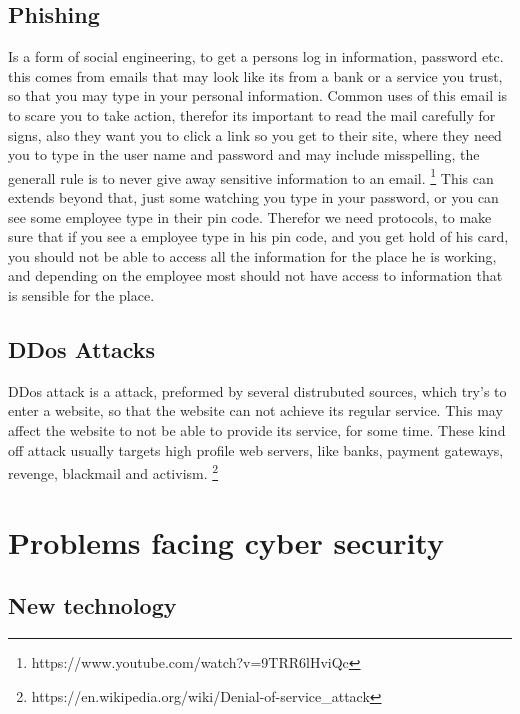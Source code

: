 \documentclass{article}
\begin{document}
\subsection{Phishing}
Is a form of social engineering, to get a persons log in information, password etc. this comes from emails that may look like its from a bank or a service you trust, so that you may type in your personal information. Common uses of this email is to scare you to take action, therefor its important to read the mail carefully for signs, also they want you to click a link so you get to their site, where they need you to type in the user name and password and may include misspelling, the generall rule is to never give away sensitive information to an email. \footnote{https://www.youtube.com/watch?v=9TRR6lHviQc}
This can extends beyond that, just some watching you type in your password, or you can see some employee type in their pin code. Therefor we need protocols, to make sure that if you see a employee type in his pin code, and you get hold of his card, you should not be able to access all the information for the place he is working, and depending on the employee most should not have access to information that is sensible for the place.

\subsection{DDos Attacks}
DDos attack is a attack, preformed by several distrubuted sources, which try's to enter a website, so that the website can not achieve its regular service. This may affect the website to not be able to provide its service, for some time. These kind off attack usually targets high profile web servers, like banks, payment gateways, revenge, blackmail and activism. \footnote{https://en.wikipedia.org/wiki/Denial-of-service\_attack}


\section{Problems facing cyber security}
\subsection{New technology}
\end{document}
